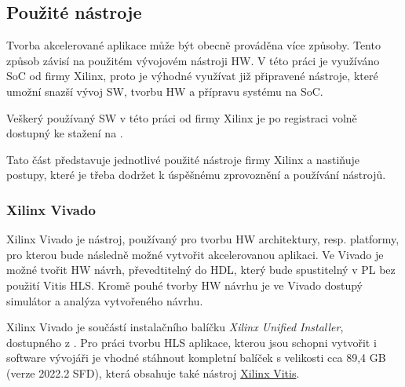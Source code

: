 \documentclass[a4paper, twoside, 11pt]{article}
\begin{document}
	\subsection{Použité nástroje}
		Tvorba akcelerované aplikace může být obecně prováděna více způsoby. Tento způsob závisí na použitém vývojovém nástroji HW. V této práci je využíváno SoC od firmy Xilinx, proto je výhodné využívat již připravené nástroje, které umožní snazší vývoj SW, tvorbu HW a přípravu systému na SoC.\par
		Veškerý používaný SW v této práci od firmy Xilinx je po registraci volně dostupný ke stažení na \cite{xilinx-downloads}.\par
		Tato část představuje jednotlivé použité nástroje firmy Xilinx a nastiňuje postupy, které je třeba dodržet k úspěšnému zprovoznění a používání nástrojů.
		\subsubsection{Xilinx Vivado}\label{subsubsec:xilinx-vivado}
			Xilinx Vivado je nástroj, používaný pro tvorbu HW architektury, resp. platformy, pro kterou bude následně možné vytvořit akcelerovanou aplikaci. Ve Vivado je možné tvořit HW návrh, převedtitelný do HDL, který bude spustitelný v PL bez použití Vitis HLS. Kromě pouhé tvorby HW návrhu je ve Vivado dostupý simulátor a analýza vytvořeného návrhu.\par
			Xilinx Vivado je součástí instalačního balíčku \textit{Xilinx Unified Installer}, dostupného z \cite{xilinx-downloads}. Pro práci tvorbu HLS aplikace, kterou jsou schopni vytvořit i software vývojáři je vhodné stáhnout kompletní balíček s velikosti cca 89,4 GB (verze 2022.2 SFD), která obsahuje také nástroj \hyperref[subsubsec:xilinx-vitis]{Xilinx Vitis}.
\end{document}
